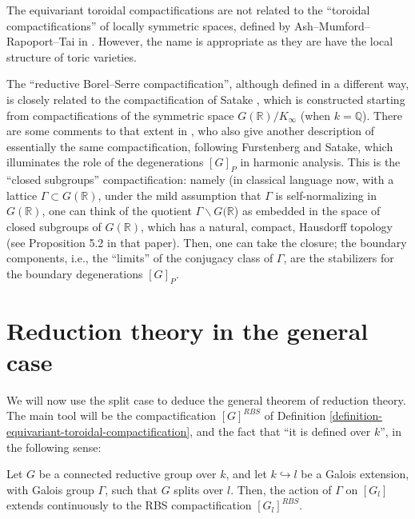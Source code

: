 \begin{remark}
 \label{remark-toroidal-name}
The equivariant toroidal compactifications are not related to the ``toroidal compactifications'' of locally symmetric spaces, defined by Ash--Mumford--Rapoport--Tai in \cite{Ash-Mumford-Rapoport-Tai}. However, the name is appropriate as they are have the local structure of toric varieties. 
\end{remark}

\begin{remark}
 \label{remark-RBS-Satake}
The ``reductive Borel--Serre compactification'', although defined in a different way, is closely related to the compactification of Satake \cite{Satake-compactifications}, which is constructed starting from compactifications of the symmetric space $G(\mathbb R)/K_\infty$ (when $k=\mathbb Q$). There are some comments to that extent in \cite{Borel-Ji}, who also give another description of essentially the same compactification, following Furstenberg and Satake, which illuminates the role of the degenerations $[G]_P$ in harmonic analysis. This is the ``closed subgroups'' compactification: namely (in classical language now, with a lattice $\Gamma\subset G(\mathbb R)$, under the mild assumption that $\Gamma$ is self-normalizing in $G(\mathbb R)$, one can think of the quotient $\Gamma\backslash G(\mathbb R$) as embedded in the space of closed subgroups of $G(\mathbb R)$, which has a natural, compact, Hausdorff topology (see Proposition 5.2 in that paper). Then, one can take the closure; the boundary components, i.e., the ``limits'' of the conjugacy class of $\Gamma$, are the stabilizers for the boundary degenerations $[G]_P$. 
\end{remark}





\section{Reduction theory in the general case}
\label{section-reduction-theory-general}

We will now use the split case to deduce the general theorem of reduction theory. The main tool will be the compactification $[G]^{RBS}$ of Definition \ref{definition-equivariant-toroidal-compactification}, and the fact that ``it is defined over $k$'', in the following sense:

\begin{proposition}
 \label{proposition-RBS-Galois-stable}
 Let $G$ be a connected reductive group over $k$, and let $k\hookrightarrow l$ be a Galois extension, with Galois group $\Gamma$, such that $G$ splits over $l$. Then, the action of $\Gamma$ on $[G_l]$ extends continuously to the RBS compactification $[G_l]^{RBS}$.
\end{proposition}

